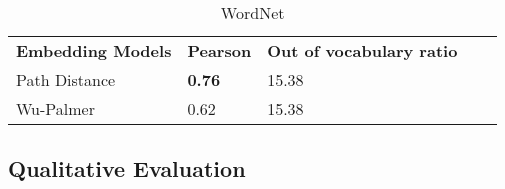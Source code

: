 \begin{table}[]
\caption{WordNet}
\label{tab:worneteval}
\centering%
\begin{minipage}{.6\textwidth}
\begin{tabular}{@{}lllll@{}}
\cmidrule(r){1-5}
\textbf{Embedding Models} & \textbf{Pearson}          & \textbf{Out of vocabulary ratio} \\ 
\cmidrule(r){1-3}
Path Distance & \textbf{0.76}    & 15.38                   \\
Wu-Palmer     & 0.62             & 15.38                   \\ \cmidrule(r){1-3}
\end{tabular}
\end{minipage}
\end{table}

\subsection{Qualitative Evaluation}\label{chap:results:quantitative}
